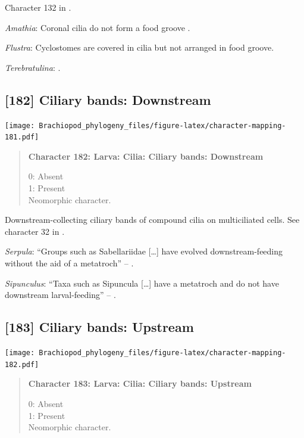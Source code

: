 \documentclass[openany]{book}
\begin{document}
Character 132 in \citet{Rouse1999}.

\hypertarget{Amathia-coding-181}{}
\emph{Amathia}: Coronal cilia do not form a food groove
\citep{Reed1982}.

\hypertarget{Flustra-coding-181}{}
\emph{Flustra}: Cyclostomes are covered in cilia but not arranged in
food groove.

\hypertarget{Terebratulina-coding-181}{}
\emph{Terebratulina}: \citet{Williams1997Introduction}.

\subsection*{{[}182{]} Ciliary bands:
Downstream}\label{ciliary-bands-downstream}

\texttt{[image: Brachiopod\_phylogeny\_files/figure-latex/character-mapping-181.pdf]}

\begin{quote}
\textbf{Character 182: Larva: Cilia: Ciliary bands: Downstream}

0: Absent\\
1: Present\\
Neomorphic character.
\end{quote}

Downstream-collecting ciliary bands of compound cilia on multiciliated
cells. See character 32 in \citet{Glenner2004}.

\hypertarget{Serpula-coding-182}{}
\emph{Serpula}: ``Groups such as Sabellariidae {[}\ldots{}{]} have
evolved downstream-feeding without the aid of a metatroch'' --
\citep{Rouse2000}.

\hypertarget{Sipunculus-coding-182}{}
\emph{Sipunculus}: ``Taxa such as Sipuncula {[}\ldots{}{]} have a
metatroch and do not have downstream larval-feeding'' --
\citet{Rouse2000}.

\subsection*{{[}183{]} Ciliary bands:
Upstream}\label{ciliary-bands-upstream}

\texttt{[image: Brachiopod\_phylogeny\_files/figure-latex/character-mapping-182.pdf]}

\begin{quote}
\textbf{Character 183: Larva: Cilia: Ciliary bands: Upstream}

0: Absent\\
1: Present\\
Neomorphic character.
\end{quote}
\end{document}
